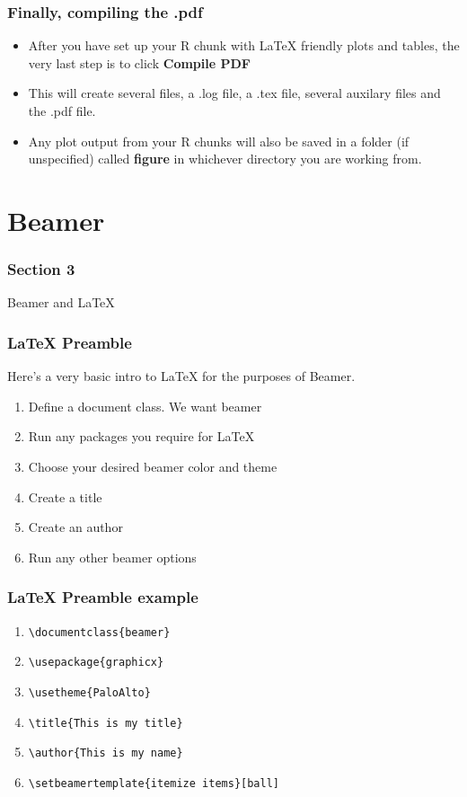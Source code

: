 \documentclass[nogin]{beamer}\usepackage[]{graphicx}\usepackage[]{color}
\begin{document}
\begin{frame}
\frametitle{Finally, compiling the .pdf}
\begin{itemize}
\item After you have set up your R chunk with LaTeX friendly plots and tables, the very last step is to click \textbf{Compile PDF}
\item This will create several files, a .log file, a .tex file, several auxilary files and the .pdf file.
\item Any plot output from your R chunks will also be saved in a folder (if unspecified) called \textbf{figure} in whichever directory you are working from.
\end{itemize}
\end{frame}

\section{Beamer}
\begin{frame}
\frametitle{Section 3}
\begin{center}
\Large
Beamer and LaTeX
\end{center}
\end{frame}

\begin{frame}[fragile]
\frametitle{LaTeX Preamble}
Here's a very basic intro to LaTeX for the purposes of Beamer.
\begin{enumerate}
\item Define a document class. We want beamer
\item Run any packages you require for LaTeX
\item Choose your desired beamer color and theme
\item Create a title
\item Create an author
\item Run any other beamer options
\end{enumerate}
\end{frame}

\begin{frame}[fragile]
\frametitle{LaTeX Preamble example}
\begin{enumerate}
\item \verb|\documentclass{beamer}|
\item \verb|\usepackage{graphicx}|
\item \verb|\usetheme{PaloAlto}|
\item \verb|\title{This is my title}|
\item \verb|\author{This is my name}|
\item \verb|\setbeamertemplate{itemize items}[ball]|
\end{enumerate}
\end{frame}
\end{document}
